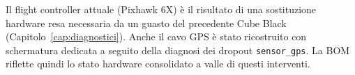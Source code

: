 \begin{notabox}
Il flight controller attuale (Pixhawk 6X) \`e il risultato di una sostituzione
hardware resa necessaria da un guasto del precedente Cube Black
(Capitolo~\ref{cap:diagnostici}). Anche il cavo GPS \`e stato ricostruito con
schermatura dedicata a seguito della diagnosi dei dropout
\texttt{sensor\_gps}. La BOM riflette quindi lo stato hardware consolidato a
valle di questi interventi.
\end{notabox}
